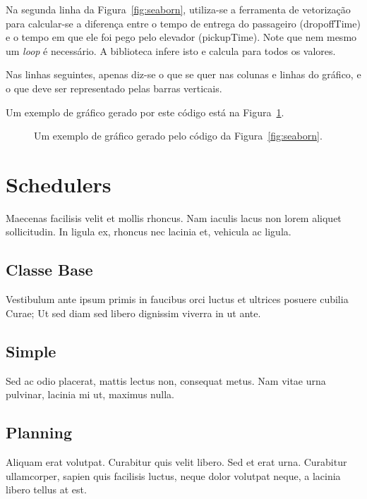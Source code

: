 Na segunda linha da Figura~\ref{fig:seaborn}, utiliza-se a ferramenta de
vetorização para calcular-se a diferença entre o tempo de entrega do passageiro
(\textsf{dropoffTime}) e o tempo em que ele foi pego pelo elevador
(\textsf{pickupTime}). Note que nem mesmo um \textit{loop} é necessário. A
biblioteca infere isto e calcula para todos os valores.

Nas linhas seguintes, apenas diz-se o que se quer nas colunas e linhas do
gráfico, e o que deve ser representado pelas barras verticais.

Um exemplo de gráfico gerado por este código está na Figura~\ref{fig:seaborn:exemplo}.

\begin{figure}[htb]
  \centering
  
  \caption{Um exemplo de gráfico gerado pelo código da
    Figura~\ref{fig:seaborn}.}
  \label{fig:seaborn:exemplo}
\end{figure}

\section{Schedulers}

Maecenas facilisis velit et mollis rhoncus. Nam iaculis lacus non lorem aliquet
sollicitudin. In ligula ex, rhoncus nec lacinia et, vehicula ac ligula.

\subsection{Classe Base}

Vestibulum ante ipsum primis in faucibus orci luctus et ultrices posuere cubilia
Curae; Ut sed diam sed libero dignissim viverra in ut ante.

\subsection{Simple}

Sed ac odio placerat, mattis lectus non, consequat metus. Nam vitae urna
pulvinar, lacinia mi ut, maximus nulla.

\subsection{Planning}

Aliquam erat volutpat. Curabitur quis velit libero.
Sed et erat urna. Curabitur ullamcorper, sapien quis facilisis luctus, neque
dolor volutpat neque, a lacinia libero tellus at est.

